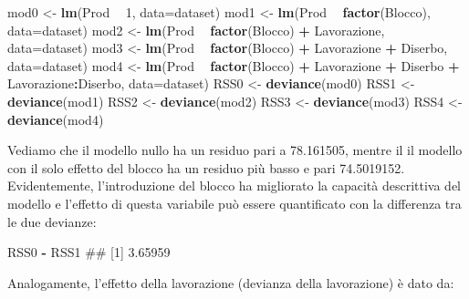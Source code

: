 \documentclass[a4paper,12pt,oneside]{book}
\newenvironment{Shaded}{\begin{snugshade}}{\end{snugshade}}
\newcommand{\KeywordTok}[1]{\textcolor[rgb]{0.13,0.29,0.53}{\textbf{#1}}}
\newcommand{\DataTypeTok}[1]{\textcolor[rgb]{0.13,0.29,0.53}{#1}}
\newcommand{\DecValTok}[1]{\textcolor[rgb]{0.00,0.00,0.81}{#1}}
\newcommand{\StringTok}[1]{\textcolor[rgb]{0.31,0.60,0.02}{#1}}
\newcommand{\OperatorTok}[1]{\textcolor[rgb]{0.81,0.36,0.00}{\textbf{#1}}}
\newcommand{\NormalTok}[1]{#1}
\theoremstyle{definition}
\theoremstyle{definition}
\theoremstyle{definition}
\theoremstyle{remark}
\begin{document}
\begin{Shaded}
\begin{Highlighting}[]
\NormalTok{mod0 <-}\StringTok{ }\KeywordTok{lm}\NormalTok{(Prod }\OperatorTok{~}\StringTok{ }\DecValTok{1}\NormalTok{, }\DataTypeTok{data=}\NormalTok{dataset)}
\NormalTok{mod1 <-}\StringTok{ }\KeywordTok{lm}\NormalTok{(Prod }\OperatorTok{~}\StringTok{ }\KeywordTok{factor}\NormalTok{(Blocco), }\DataTypeTok{data=}\NormalTok{dataset)}
\NormalTok{mod2 <-}\StringTok{ }\KeywordTok{lm}\NormalTok{(Prod }\OperatorTok{~}\StringTok{ }\KeywordTok{factor}\NormalTok{(Blocco) }\OperatorTok{+}\StringTok{ }\NormalTok{Lavorazione, }\DataTypeTok{data=}\NormalTok{dataset)}
\NormalTok{mod3 <-}\StringTok{ }\KeywordTok{lm}\NormalTok{(Prod }\OperatorTok{~}\StringTok{ }\KeywordTok{factor}\NormalTok{(Blocco) }\OperatorTok{+}\StringTok{ }\NormalTok{Lavorazione }\OperatorTok{+}\StringTok{ }\NormalTok{Diserbo, }\DataTypeTok{data=}\NormalTok{dataset)}
\NormalTok{mod4 <-}\StringTok{ }\KeywordTok{lm}\NormalTok{(Prod }\OperatorTok{~}\StringTok{ }\KeywordTok{factor}\NormalTok{(Blocco) }\OperatorTok{+}\StringTok{ }\NormalTok{Lavorazione }\OperatorTok{+}\StringTok{ }\NormalTok{Diserbo }\OperatorTok{+}
\StringTok{            }\NormalTok{Lavorazione}\OperatorTok{:}\NormalTok{Diserbo, }\DataTypeTok{data=}\NormalTok{dataset)}
\NormalTok{RSS0 <-}\StringTok{ }\KeywordTok{deviance}\NormalTok{(mod0)}
\NormalTok{RSS1 <-}\StringTok{ }\KeywordTok{deviance}\NormalTok{(mod1)}
\NormalTok{RSS2 <-}\StringTok{ }\KeywordTok{deviance}\NormalTok{(mod2)}
\NormalTok{RSS3 <-}\StringTok{ }\KeywordTok{deviance}\NormalTok{(mod3)}
\NormalTok{RSS4 <-}\StringTok{ }\KeywordTok{deviance}\NormalTok{(mod4)}
\end{Highlighting}
\end{Shaded}

Vediamo che il modello nullo ha un residuo pari a 78.161505, mentre il
il modello con il solo effetto del blocco ha un residuo più basso e pari
74.5019152. Evidentemente, l'introduzione del blocco ha migliorato la
capacità descrittiva del modello e l'effetto di questa variabile può
essere quantificato con la differenza tra le due devianze:

\begin{Shaded}
\begin{Highlighting}[]
\NormalTok{RSS0 }\OperatorTok{-}\StringTok{ }\NormalTok{RSS1}
\NormalTok{## [1] 3.65959}
\end{Highlighting}
\end{Shaded}

Analogamente, l'effetto della lavorazione (devianza della lavorazione) è
dato da:
\end{document}
